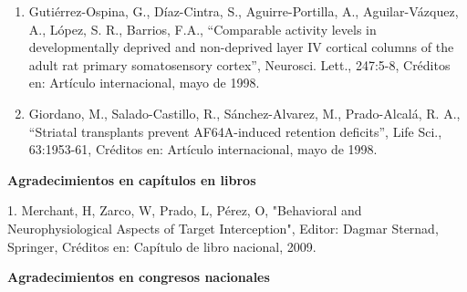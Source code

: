 \documentclass[12pt]{article}
\begin{document}
\begin{enumerate}
\item Gutiérrez-Ospina, G., Díaz-Cintra, S., Aguirre-Portilla, A., Aguilar-Vázquez, A., López, S. R., Barrios, F.A., “Comparable 
activity levels in developmentally deprived and non-deprived layer IV cortical columns of the adult rat primary somatosensory cortex”, 
Neurosci. Lett., 247:5-8, Créditos en: Artículo internacional, mayo de 1998.

\item Giordano, M., Salado-Castillo, R., Sánchez-Alvarez, M., Prado-Alcalá, R. A., “Striatal transplants prevent AF64A-induced 
retention 
deficits”, Life Sci., 63:1953-61, Créditos en: Artículo internacional, mayo de 1998.
\end{enumerate}

\textbf{Agradecimientos en capítulos en libros}

\hfill

1. Merchant, H, Zarco, W, Prado, L, Pérez, O, "Behavioral and Neurophysiological Aspects of Target Interception", Editor: Dagmar 
Sternad, Springer, Créditos en: Capítulo de libro nacional, 2009.

\hfill

\textbf{Agradecimientos en congresos nacionales}

\hfill
\end{document}
